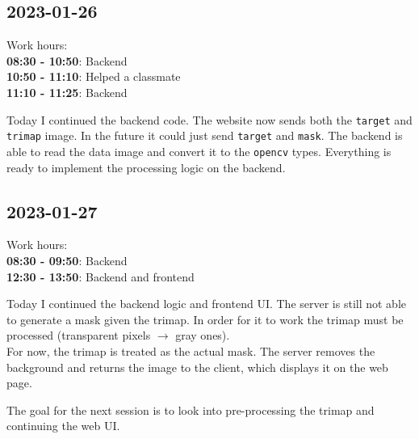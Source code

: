\documentclass{article}
\begin{document}
\subsection{2023-01-26}

Work hours:\\
\textbf{08:30 - 10:50}: Backend \\
\textbf{10:50 - 11:10}: Helped a classmate \\
\textbf{11:10 - 11:25}: Backend

Today I continued the backend code. The website now sends both the \texttt{target}
and \texttt{trimap} image. In the future it could just send \texttt{target} and \texttt{mask}.
The backend is able to read the data image and convert it to the \texttt{opencv} types.
Everything is ready to implement the processing logic on the backend.

\subsection{2023-01-27}

Work hours:\\
\textbf{08:30 - 09:50}: Backend \\
\textbf{12:30 - 13:50}: Backend and frontend

Today I continued the backend logic and frontend UI.
The server is still not able to generate a mask given the trimap.
In order for it to work the trimap must be processed (transparent pixels \(\rightarrow\) gray ones). \\
For now, the trimap is treated as the actual mask. The server removes the background and returns
the image to the client, which displays it on the web page.

The goal for the next session is to look into pre-processing the trimap
and continuing the web UI.

\pagebreak
\end{document}
